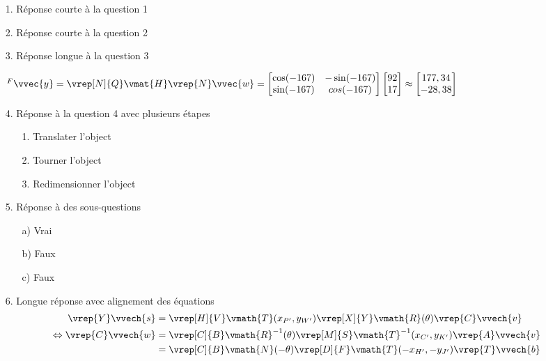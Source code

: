 \documentclass{gif7001}
\begin{document}
\vcourt

\begin{enumerate}
    \item[1.] Réponse courte à la question 1
    \item[2.] Réponse courte à la question 2
    \item[3.] Réponse longue à la question 3

    $^F\vvec{y} = \vrep[N]{Q}\vmat{H} \vrep{N}\vvec{w} = \begin{bmatrix} \cos(-167) & -\sin(-167) \\ \sin(-167) & cos(-167) \end{bmatrix} \begin{bmatrix} 92 \\ 17 \end{bmatrix} \approx \begin{bmatrix} 177,34 \\ -28,38 \end{bmatrix}$
    \item[4.] Réponse à la question 4 avec plusieurs étapes
    \begin{enumerate}
        \item[1.] Translater l'object
        \item[2.] Tourner l'object
        \item[3.] Redimensionner l'object
    \end{enumerate}
    \item[5.] Réponse à des sous-questions
    \begin{enumerate}
        \item[a)] Vrai
        \item[b)] Faux
        \item[c)] Faux
    \end{enumerate}
    \item[6.] Longue réponse avec alignement des équations
    \begin{align*}
        \vrep{Y}\vvech{s} &= \vrep[H]{V}\vmath{T}(x_{P'},y_{W'}) \vrep[X]{Y}\vmath{R}(\theta) \vrep{C}\vvech{v} \\
        \Leftrightarrow \vrep{C}\vvech{w} &= \vrep[C]{B}\vmath{R}^{-1}(\theta) \vrep[M]{S}\vmath{T}^{-1}(x_{C'},y_{K'}) \vrep{A}\vvech{v} \\
        &= \vrep[C]{B}\vmath{N}(-\theta) \vrep[D]{F}\vmath{T}(-x_{H'},-y_{J'}) \vrep{T}\vvech{b} \\

\end{align*}
\end{enumerate}
\end{document}
